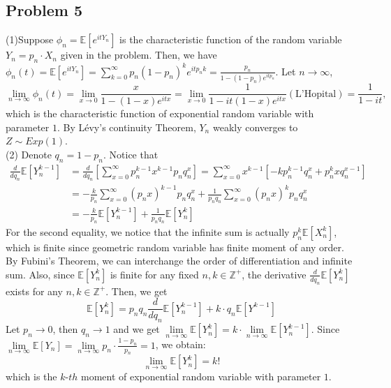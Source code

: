 \documentclass[12pt]{article}
\begin{document}
	\subsection*{Problem 5}
	(1)Suppose $\phi_{n}=\mathbb{E}[e^{itY_{n}}]$ is the characteristic function of the random variable $Y_{n}=p_{n}\cdot X_{n}$ given in the problem. Then, we have $\phi_{n}(t)=\mathbb{E}[e^{itY_{n}}]=\sum\limits_{k=0}^{\infty}p_{n}(1-p_{n})^{k}e^{itp_{n}k}=\frac{p_{n}}{1-(1-p_{n})e^{itp_{n}}}$. Let $n\rightarrow\infty$, $$\lim\limits_{n\rightarrow\infty}\phi_{n}(t)=\lim\limits_{x\rightarrow 0}\frac{x}{1-(1-x)e^{itx}}=\lim\limits_{x\rightarrow 0}\frac{1}{1-it(1-x)e^{itx}}(\text{L'Hopital})=\frac{1}{1-it},$$
which is the characteristic function of exponential random variable with parameter $1$. By L\'{e}vy's continuity Theorem, $Y_{n}$ weakly converges to $Z\sim Exp(1)$.\\
(2) Denote $q_{n}=1-p_{n}$. Notice that 
\begin{align*}
\frac{d}{d q_{n}}\mathbb{E}[Y_{n}^{k-1}]&=\frac{d}{d q_{n}}[\sum_{x=0}^{\infty}p_{n}^{k-1}x^{k-1}p_{n}q_{n}^{x}]=	\sum_{x=0}^{\infty}x^{k-1}[-kp_{n}^{k-1}q_{n}^{x}+p_{n}^{k}x q_{n}^{x-1}]\\
&=-\frac{k}{p_{n}}\sum_{x=0}^{\infty}(p_{n}x)^{k-1}p_{n}q_{n}^{x}+\frac{1}{p_{n}q_{n}}\sum_{x=0}^{\infty}(p_{n}x)^{k}p_{n}q_{n}^{x}\\
&=-\frac{k}{p_{n}}\mathbb{E}[Y_{n}^{k-1}]+\frac{1}{p_{n}q_{n}}\mathbb{E}[Y_{n}^{k}]
\end{align*}
For the second equality, we notice that the infinite sum is actually $p_{n}^{k}\mathbb{E}[X_{n}^{k}]$, which is finite since geometric random variable has finite moment of any order.  By Fubini's Theorem, we can interchange the order of differentiation and infinite sum. Also, since $\mathbb{E}[Y_{n}^{k}]$ is finite for any fixed $n,k\in \mathbb{Z}^{+}$, the derivative $\frac{d}{d q_{n}}\mathbb{E}[Y_{n}^{k}]$ exists for any $n,k\in \mathbb{Z}^{+}$. Then, we get $$\mathbb{E}[Y_{n}^{k}]=p_{n}q_{n}\frac{d}{d q_{n}}\mathbb{E}[Y_{n}^{k-1}]+k\cdot q_{n}\mathbb{E}[Y^{k-1}]$$
Let $p_{n}\rightarrow 0$, then $q_{n}\rightarrow 1$ and we get $\lim\limits_{n\rightarrow\infty}\mathbb{E}[Y_{n}^{k}]=k\cdot \lim\limits_{n\rightarrow\infty}\mathbb{E}[Y_{n}^{k-1}]$.
Since $\lim\limits_{n\rightarrow\infty}\mathbb{E}[Y_{n}]=\lim\limits_{n\rightarrow\infty}p_{n}\cdot\frac{1-p_{n}}{p_{n}}=1$, we obtain: $$\lim\limits_{n\rightarrow\infty}\mathbb{E}[Y_{n}^k]=k!$$
which is the $k$-$th$ moment of exponential random variable with parameter $1$.
\end{document}

